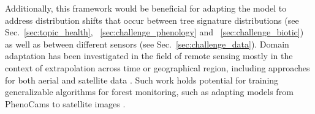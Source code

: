 \documentclass{CUP-JNL-DTM}%
\theoremstyle{definition}
\numberwithin{equation}{section}
\begin{document}
%
Additionally, this framework would be beneficial for adapting the model to address distribution shifts that occur between tree signature distributions (see Sec.~\ref{sec:topic_health}, ~\ref{sec:challenge_phenology} and ~\ref{sec:challenge_biotic}) as well as between different sensors (see Sec.~\ref{sec:challenge_data}).
%
Domain adaptation has been investigated in the field of remote sensing mostly in the context of extrapolation across time or geographical region, including approaches for both aerial and satellite data \cite{wang_exploring_2022, shi_unsupervised_2022, xu_universal_2023, ma_unsupervised_2023, arnaudo_hierarchical_2023} .
Such work holds potential for training generalizable algorithms for forest monitoring, such as adapting models from PhenoCams to satellite images \cite{kosmala_integrating_2018}. 

\end{document}
